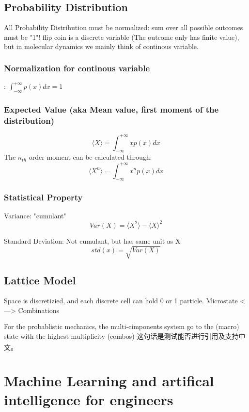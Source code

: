 \documentclass[a4paper]{article}
\newcommand{\upcite}[1]{\textsuperscript{\cite{#1}}}
\begin{document}
\subsection{Probability Distribution}
All Probability Distribution must be normalized: sum over all possible outcomes must be "1"!
flip coin is a discrete variable (The outcome only has finite value), but in molecular dynamics we mainly think of continous variable.
\subsubsection{Normalization for continous variable}:
$\int_{-\infty}^{+\infty} p(x)dx = 1$
\subsubsection{Expected Value (aka Mean value, first moment of the distribution)}
\begin{equation}
	\langle X \rangle=\int_{-\infty}^{+\infty}xp(x)dx
\end{equation}
The $n_{th}$ order moment can be calculated through:
\begin{equation}
	\langle X^{n} \rangle = \int_{-\infty}^{+\infty}x^{n}p(x) dx
\end{equation}

\subsubsection{Statistical Property}
Variance: "cumulant"
\begin{equation}
	Var(X)=\langle X^{2} \rangle - {\langle X \rangle}^{2}
\end{equation}

Standard Deviation: Not cumulant, but has same unit as X
\begin{equation}
	std(x)=\sqrt{Var(X)}
\end{equation}

\subsection{Lattice Model}
Space is discretizied, and each discrete cell can hold 0 or 1 particle.
Microstate <---> Combinations

For the probablistic mechanics, the multi-cimponents system go to the (macro) state with the highest multiplicity (combos)
这句话是测试能否进行引用及支持中文\upcite{1}。

\section{Machine Learning and artifical intelligence for engineers}
\end{document}
